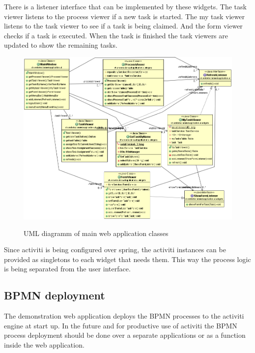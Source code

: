 \documentclass[paper=a4,twoside=false,BCOR=0mm,DIV=calc,fontsize=12pt]{scrartcl}
\begin{document}
There is a listener interface that can be implemented by these widgets. The task viewer listens to the process viewer if a new task is started. The
my task viewer listens to the task viewer to see if a task is being claimed. And the form viewer checks if a task is executed. When the task is
finished the task viewers are updated to show the remaining tasks.

\begin{figure}
    \begin{center}
      \includegraphics[width=1\textwidth]{./img/uml_webapp_model.png}\\
    \end{center}
  \caption{UML diagramm of main web application classes}
  \label{webapplicationclassuml}
\end{figure} 

Since activiti is being configured over spring, the activiti instances can be provided as singletons to each widget that needs them. This way the
process logic is being separated from the user interface.




\subsection{BPMN deployment}
The demonstration web application deploys the BPMN processes to the activiti engine at start up. In the future and for productive use of activiti the
BPMN process deployment should be done over a separate applications or as a function inside the web application. 
\end{document}

